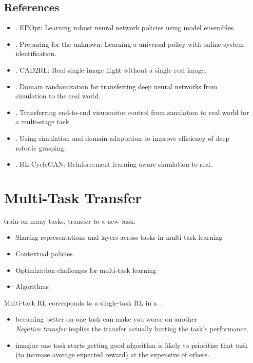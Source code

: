 \subsection{References}
\begin{itemize}
	\item {}. EPOpt: Learning robust neural network policies using model ensembles.
	\item {}. Preparing for the unknown: Learning a universal policy with online system identification.
	\item {}. CAD2RL: Real single-image flight without a single real image.
	\item {}. Domain randomization for transferring deep neural networks from simulation to the real world.
	\item {}. Transferring end-to-end visuomotor control from simulation to real world for a multi-stage task.
	\item {}. Using simulation and domain adaptation to improve efficiency of deep robotic grasping.
	\item {}. RL-CycleGAN: Reinforcement learning aware simulation-to-real.
\end{itemize}

\section{Multi-Task Transfer}
 train on many tasks, transfer to a new task.
\begin{itemize}
	\item Sharing representations and layers across tasks in multi-task learning
	\item Contextual policies
	\item Optimization challenges for multi-task learning
	\item Algorithms
\end{itemize}

Multi-task \ac{RL} corresponds to a single-task \ac{RL} in a .

\begin{itemize}
	\item {} becoming better on one task can make you worse on another\\
	\textit{Negative transfer} implies the transfer actually hurting the task's performance.
	\item {} imagine one task starts getting good algorithm is likely to prioritize that task (to increase average expected reward) at the expensive of others.
\end{itemize}

